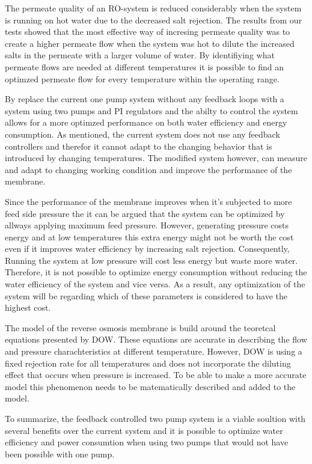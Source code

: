 
The permeate quality of an RO-system is reduced considerably when the system is running on hot water due to the decreased salt rejection. The results from our tests showed that the most effective way of incresing permeate quality was to create a higher permeate flow when the system was hot to dilute the increased salts in the permeate with a larger volume of water. By identifiying what permeate flows are needed at different temperatures it is possible to find an optimzed permeate flow for every temperature within the operating range.
 
By replace the current one pump system without any feedback loops with a system using two pumps and PI regulators and the abilty to control the system allows for a more optimzed performance on both water efficiency and energy consumption. As mentioned, the current system does not use any feedback controllers and therefor it cannot adapt to the changing behavior that is introduced by changing temperatures. The modified system however, can measure and adapt to changing working condition and improve the performance of the membrane. 
 
Since the performance of the membrane improves when it's subjected to more feed side pressure the it can be argued that the system can be optimized by allways applying maximum feed pressure. However, generating pressure costs energy and at low temperatures this extra energy might not be worth the cost even if it improves water efficiency by increasing salt rejection. Consequently, Running the system at low pressure will cost less energy but waste more water. Therefore, it is not possible to optimize energy consumption without reducing the water efficiency of the system and vice versa. As a result, any optimization of the system will be regarding which of these parameters is considered to have the highest cost. 
 
The model of the reverse osmosis membrane is build around the teoretcal equations presented by DOW. These equations are accurate in describing the flow and pressure charachteristics at different temperature. However, DOW is using a fixed rejection rate for all temperatures and does not incorporate the diluting effect that occurs when pressure is increased.  To be able to make a more accurate model this phenomenon needs to be matematically described and added to the model. 
 
To summarize, the feedback controlled two pump system is a viable soultion with several benefits over the current system and it is possible to optimize water efficiency and power consumtion when using two pumps that would not have been possible with one pump. 